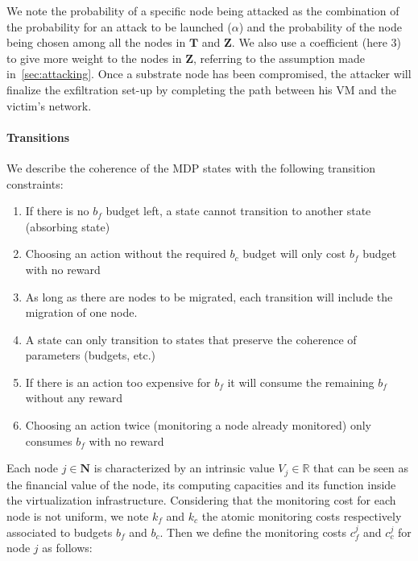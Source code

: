 We note the probability of a specific node being attacked as the combination of the probability for an attack to be launched (\ie $\alpha$) and the probability of the node being chosen among all the nodes in $\textbf{T}$ and $\textbf{Z}$. We also use a coefficient (here 3) to give more weight to the nodes in $\textbf{Z}$, referring to the assumption made in~\ref{sec:attacking}.
Once a substrate node has been compromised, the attacker will finalize the exfiltration set-up by completing the path between his VM and the victim's network.


\paragraph{Transitions}
We describe the coherence of the MDP states with the following transition constraints:

\begin{enumerate}
    \item If there is no $b_f$ budget left, a state cannot transition to another state (absorbing state)
    \label{cond:c1}
    \item Choosing an action without the required $b_c$ budget will only cost $b_f$ budget with no reward
    \label{cond:c2}
    \item As long as there are nodes to be migrated, each transition will include the migration of one node.
    \label{cond:c3}
    \item A state can only transition to states that preserve the coherence of parameters (budgets, etc.)
    \label{cond:c4}
    \item If there is an action too expensive for $b_f$ it will consume the remaining $b_f$ without any reward
    \label{cond:c5}
    \item Choosing an action twice (\ie monitoring a node already monitored) only consumes $b_f$ with no reward
    \label{cond:c6}
 \end{enumerate}

Each node $j \in \textbf{N}$ is characterized by an intrinsic value $V_j \in \mathbb{R}$ that can be seen as the financial value of the node, its computing capacities and its function inside the virtualization infrastructure. 
Considering that the monitoring cost for each node is not uniform, we note $k_{f}$ and $k_{c}$ the atomic monitoring costs respectively associated to budgets $b_f$ and $b_c$.
Then we define the monitoring costs $c_f^j$ and $c_c^j$ for node $j$ as follows:


